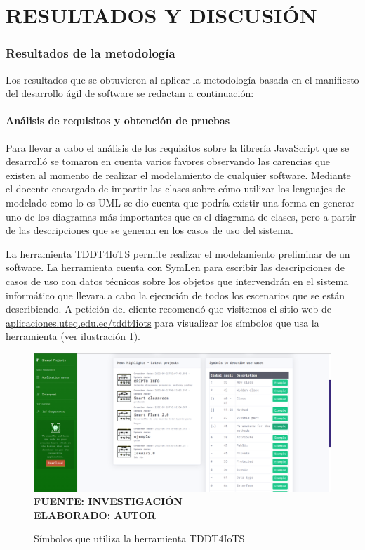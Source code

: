 \setcounter{chapter}{4}
\setcounter{section}{0}
\part{RESULTADOS Y DISCUSIÓN} 

\section{Resultados de la metodología}

Los resultados que se obtuvieron al aplicar la metodología basada en el manifiesto del desarrollo ágil de software se redactan a continuación:

\subsection{Análisis de requisitos y obtención de pruebas}

Para llevar a cabo el análisis de los requisitos sobre la librería JavaScript que se desarrolló se tomaron en cuenta varios favores observando las carencias que existen al momento de realizar el modelamiento de cualquier software. Mediante el docente encargado de impartir las clases sobre cómo utilizar los lenguajes de modelado como lo es UML se dio cuenta que podría existir una forma en generar uno de los diagramas más importantes que es el diagrama de clases, pero a partir de las descripciones que se generan en los casos de uso del sistema.

La herramienta TDDT4IoTS permite realizar el modelamiento  preliminar de un software. La herramienta cuenta con SymLen para escribir las descripciones de casos de uso con datos técnicos sobre los objetos que intervendrán en el sistema informático que llevara a cabo la ejecución de todos los escenarios que se están describiendo. A petición del cliente recomendó que visitemos el sitio web de \url{aplicaciones.uteq.edu.ec/tddt4iots} para visualizar  los símbolos que usa la herramienta (ver ilustración \ref{fig:simbolostdd}).

\begin{figure}[H]
	\centering
	\caption{Símbolos que utiliza la herramienta TDDT4IoTS}
	\includegraphics[width=12cm]{img/res_001.png}
	\label{fig:simbolostdd}
	\vspace{4mm}
	{\footnotesize \textbf{\\ FUENTE: INVESTIGACIÓN} \textbf{\\ ELABORADO: AUTOR}}
\end{figure}

